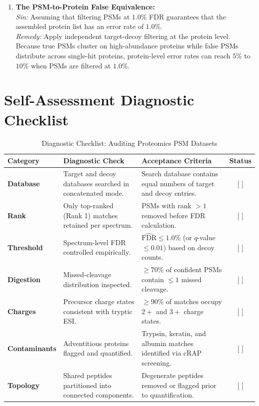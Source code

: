 \documentclass[11pt,twoside,openright]{book}
\begin{document}
\begin{enumerate}
    \item \textbf{The PSM-to-Protein False Equivalence:}\\
    \textit{Sin:} Assuming that filtering PSMs at $1.0\%$ FDR guarantees that the assembled protein list has an error rate of $1.0\%$.\\
    \textit{Remedy:} Apply independent target-decoy filtering at the protein level. Because true PSMs cluster on high-abundance proteins while false PSMs distribute across single-hit proteins, protein-level error rates can reach $5\%$ to $10\%$ when PSMs are filtered at $1.0\%$.
\end{enumerate}

\section{Self-Assessment Diagnostic Checklist}

\begin{table}[ht]
\centering
\caption{Diagnostic Checklist: Auditing Proteomics PSM Datasets}
\label{tab:psm_checklist}
\small
\begin{tabularx}{\textwidth}{l p{5.5cm} X c}
\toprule
\textbf{Category} & \textbf{Diagnostic Check} & \textbf{Acceptance Criteria} & \textbf{Status} \\
\midrule
\textbf{Database} & Target and decoy databases searched in concatenated mode. & Search database contains equal numbers of target and decoy entries. & [ ] \\
\addlinespace
\textbf{Rank} & Only top-ranked (Rank 1) matches retained per spectrum. & PSMs with rank $> 1$ removed before FDR calculation. & [ ] \\
\addlinespace
\textbf{Threshold} & Spectrum-level FDR controlled empirically. & $\widehat{\text{FDR}} \le 1.0\%$ (or $q$-value $\le 0.01$) based on decoy counts. & [ ] \\
\addlinespace
\textbf{Digestion} & Missed-cleavage distribution inspected. & $\ge 70\%$ of confident PSMs contain $\le 1$ missed cleavage. & [ ] \\
\addlinespace
\textbf{Charges} & Precursor charge states consistent with tryptic ESI. & $\ge 90\%$ of matches occupy $2+$ and $3+$ charge states. & [ ] \\
\addlinespace
\textbf{Contaminants} & Adventitious proteins flagged and quantified. & Trypsin, keratin, and albumin matches identified via cRAP screening. & [ ] \\
\addlinespace
\textbf{Topology} & Shared peptides partitioned into connected components. & Degenerate peptides removed or flagged prior to quantification. & [ ] \\
\bottomrule
\end{tabularx}
\end{table}
\end{document}
